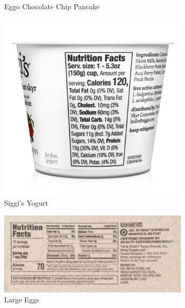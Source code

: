 \documentclass{article}
\begin{document}
\begin{figure}[h]
\begin{subfigure}{0.2\textwidth}
        \caption{Eggo Chocolate Chip Pancake}
        \label{fig:2}
    \end{subfigure}%
    \begin{subfigure}{0.2\textwidth}
        \centering
        \includegraphics[width=\linewidth]{yogurt.png}
        \caption{Siggi's Yogurt}
        \label{fig:3}
    \end{subfigure}%
    \begin{subfigure}{0.2\textwidth}
        \centering
        \includegraphics[width=\linewidth]{egg.png}
        \caption{Large Eggs}
        \label{fig:4}
    \end{subfigure}%
    \begin{subfigure}{0.2\textwidth}
        \centering

\end{subfigure}
\end{figure}
\end{document}
